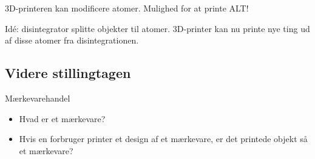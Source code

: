 3D-printeren kan modificere atomer. Mulighed for at printe ALT!

Idé: disintegrator splitte objekter til atomer. 3D-printer kan nu printe nye ting ud af disse atomer fra disintegrationen.


\subsection{Videre stillingtagen} %
\label{sub:videre_stillingtagen}

Mærkevarehandel

\begin{itemize}
	\item Hvad er et mærkevare?
	\item Hvis en forbruger printer et design af et mærkevare, er det printede objekt så et mærkevare?
	
\end{itemize}




